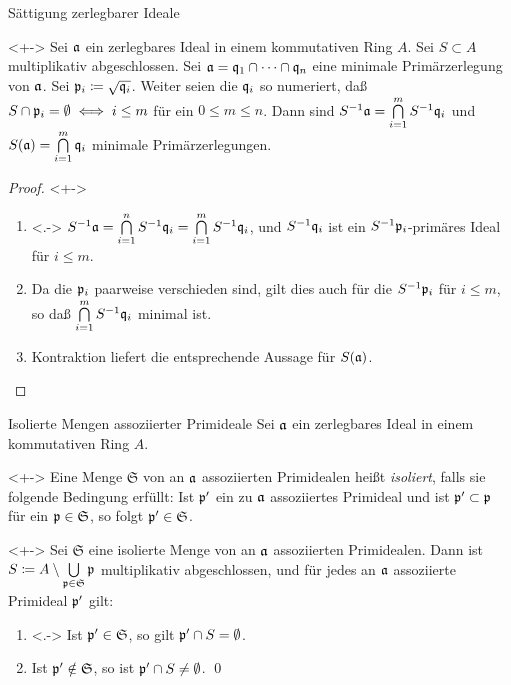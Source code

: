\begin{frame}{Sättigung zerlegbarer Ideale}
	\begin{proposition}<+->
		\label{prop:sat_decomp}
		Sei \(\mathfrak{a}\) ein zerlegbares Ideal in einem kommutativen Ring \(A\).
		Sei \(S \subset A\) multiplikativ abgeschlossen. Sei
		\(\mathfrak{a} = \mathfrak{q}_1 \cap \dotsb \cap \mathfrak{q}_n\) eine minimale
		Primärzerlegung von \(\mathfrak{a}\). Sei \(\mathfrak{p}_i \coloneqq
		\sqrt{\mathfrak{q}_i}\). Weiter seien die \(\mathfrak{q}_i\) so
		numeriert, daß \(S \cap \mathfrak{p}_i = \emptyset \iff
		i \leq m\) für ein \(0 \leq m \leq n\). Dann sind
		\(S^{-1} \mathfrak{a} = \bigcap\limits_{i = 1}^m S^{-1} \mathfrak{q}_i\)
		und \(S(\mathfrak{a}) = \bigcap\limits_{i = 1}^m \mathfrak{q}_i\)
		minimale Primärzerlegungen.
	\end{proposition}
	\begin{proof}<+->
		\begin{enumerate}[<+->]
		\item<.->
			\(S^{-1} \mathfrak{a} = \bigcap\limits_{i = 1}^n S^{-1} \mathfrak{q}_i
			= \bigcap\limits_{i = 1}^m S^{-1} \mathfrak{q}_i\), und
			\(S^{-1} \mathfrak{q}_i\) ist ein
			\(S^{-1} \mathfrak{p}_i\)-primäres Ideal für \(i \leq m\).
		\item
			Da die \(\mathfrak{p}_i\) paarweise verschieden sind, gilt dies auch
			für die \(S^{-1} \mathfrak{p}_i\) für \(i \leq m\), so daß
			\(\bigcap\limits_{i = 1}^m S^{-1} \mathfrak{q}_i\) minimal ist.
		\item
			Kontraktion liefert die entsprechende Aussage
			für \(S(\mathfrak{a})\).
			\qedhere
		\end{enumerate}
	\end{proof}
\end{frame}

\begin{frame}{Isolierte Mengen assoziierter Primideale}
	Sei \(\mathfrak{a}\) ein zerlegbares Ideal in einem kommutativen Ring \(A\).
	\begin{definition}<+->
		Eine Menge \(\mathfrak S\) von an \(\mathfrak{a}\) assoziierten Primidealen
		heißt \emph{isoliert}, falls sie folgende Bedingung erfüllt: Ist
		\(\mathfrak{p}'\) ein zu \(\mathfrak{a}\) assoziiertes Primideal und ist
		\(\mathfrak{p}' \subset \mathfrak{p}\) für ein \(\mathfrak{p} \in \mathfrak S\),
		so folgt \(\mathfrak{p}' \in \mathfrak S\).
	\end{definition}
	\begin{proposition}<+->
		Sei \(\mathfrak S\) eine isolierte Menge von an \(\mathfrak{a}\)
		assoziierten Primidealen. Dann ist \(S \coloneqq A \setminus
		\bigcup\limits_{\mathfrak{p} \in \mathfrak S} \mathfrak{p}\) multiplikativ
		abgeschlossen, und für jedes an \(\mathfrak{a}\) assoziierte Primideal
		\(\mathfrak{p}'\) gilt:
		\begin{enumerate}[<+->]
		\item<.->
			Ist \(\mathfrak{p}' \in \mathfrak S\), so gilt
			\(\mathfrak{p}' \cap S = \emptyset\).
		\item
			Ist \(\mathfrak{p}' \notin \mathfrak S\), so ist
			\(\mathfrak{p}' \cap S \neq \emptyset\).
			\qed
		\end{enumerate}
	\end{proposition}
\end{frame}

